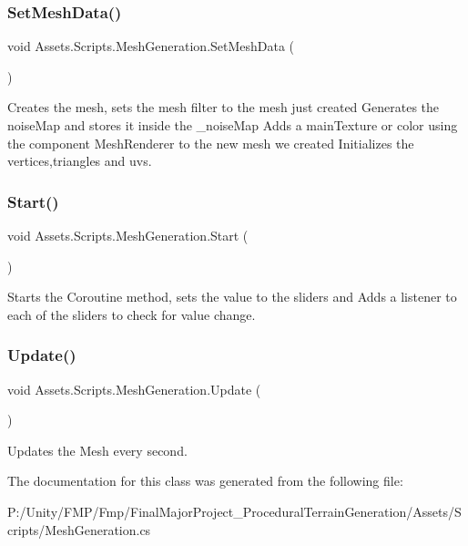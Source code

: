 \subsubsection{\texorpdfstring{SetMeshData()}{SetMeshData()}}
{\footnotesize\ttfamily void Assets.\+Scripts.\+Mesh\+Generation.\+Set\+Mesh\+Data (\begin{DoxyParamCaption}{ }\end{DoxyParamCaption})}



Creates the mesh, sets the mesh filter to the mesh just created Generates the noise\+Map and stores it inside the \+\_\+noise\+Map Adds a main\+Texture or color using the component Mesh\+Renderer to the new mesh we created Initializes the vertices,triangles and uvs. 

\mbox{\label{class_assets_1_1_scripts_1_1_mesh_generation_a41b690987228c88da57a68df85864fb8}} 
\subsubsection{\texorpdfstring{Start()}{Start()}}
{\footnotesize\ttfamily void Assets.\+Scripts.\+Mesh\+Generation.\+Start (\begin{DoxyParamCaption}{ }\end{DoxyParamCaption})\hspace{0.3cm}{\ttfamily [private]}}



Starts the Coroutine method, sets the value to the sliders and Adds a listener to each of the sliders to check for value change. 

\mbox{\label{class_assets_1_1_scripts_1_1_mesh_generation_a4cb917bfef5c78eba6e24157eb187e4d}} 
\subsubsection{\texorpdfstring{Update()}{Update()}}
{\footnotesize\ttfamily void Assets.\+Scripts.\+Mesh\+Generation.\+Update (\begin{DoxyParamCaption}{ }\end{DoxyParamCaption})\hspace{0.3cm}{\ttfamily [private]}}



Updates the Mesh every second. 



The documentation for this class was generated from the following file\+:\begin{DoxyCompactItemize}
\item 
P\+:/\+Unity/\+F\+M\+P/\+Fmp/\+Final\+Major\+Project\+\_\+\+Procedural\+Terrain\+Generation/\+Assets/\+Scripts/Mesh\+Generation.\+cs\end{DoxyCompactItemize}
